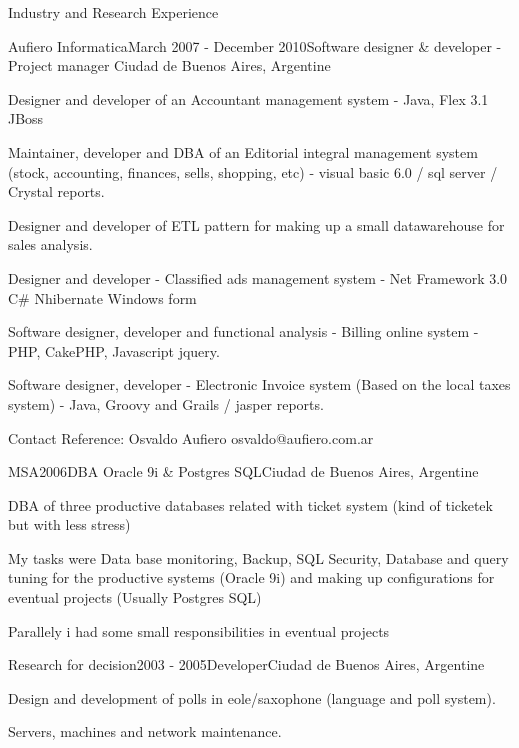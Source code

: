 \documentclass{resume} %
\begin{document}
\begin{rSection}{Industry and Research Experience}
\begin{rSubsection}{Aufiero Informatica}{March 2007 - December 2010}{Software designer \& developer - Project manager }{Ciudad de Buenos Aires, Argentine}
	\item Designer and developer of an Accountant management system - Java, Flex 3.1 JBoss 
	\item Maintainer, developer and DBA of an Editorial integral management system (stock, accounting, finances, sells, shopping, etc) - visual basic 6.0 / sql server / Crystal reports.
	\item Designer and developer of ETL pattern for making up a small datawarehouse for sales analysis.
	\item Designer and developer - Classified ads management system - Net Framework 3.0 C\# Nhibernate Windows form
	\item Software designer, developer and functional analysis - Billing online system - PHP, CakePHP, Javascript jquery. 
	\item Software designer, developer - Electronic Invoice system (Based on the local taxes system) - Java, Groovy and Grails / jasper reports.
	\item Contact Reference: Osvaldo Aufiero osvaldo@aufiero.com.ar
\end{rSubsection}


\begin{rSubsection}{MSA}{2006}{DBA Oracle 9i \& Postgres SQL}{Ciudad de Buenos Aires, Argentine}
	\item DBA of three productive databases related with ticket system (kind of ticketek but with less stress) 
	\item My tasks were Data base monitoring, Backup, SQL Security, Database and query tuning for the productive systems (Oracle 9i) and making up configurations for eventual projects (Usually Postgres SQL)
	\item Parallely i had some small responsibilities in eventual projects 
\end{rSubsection}


\begin{rSubsection}{Research for decision}{2003 - 2005}{Developer}{Ciudad de Buenos Aires, Argentine}
	\item Design and development of polls in eole/saxophone (language and poll system).
	\item Servers, machines and network maintenance.
\end{rSubsection}


\end{rSection}
\end{document}
